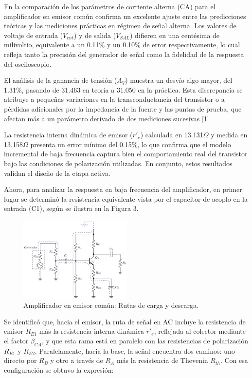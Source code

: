 \documentclass[journal]{IEEEtran}
\begin{document}
\par En la comparación de los parámetros de corriente alterna (CA) para el amplificador en emisor común confirma un excelente ajuste entre las predicciones teóricas y las mediciones prácticas en régimen de señal alterna. Los valores de voltaje de entrada (\( V_{ent}\)) y de salida (\( V_{SAL} \)) difieren en una centésima de milivoltio, equivalente a un 0.11\% y un 0.10\% de error respectivamente, lo cual refleja tanto la precisión del generador de señal como la fidelidad de la respuesta del osciloscopio. 
\par El análisis de la ganancia de tensión (\( A_V \)) muestra un desvío algo mayor, del 1.31\%, pasando de 31.463 en teoría a 31.050 en la práctica. Esta discrepancia se atribuye a pequeñas variaciones en la transconductancia del transistor o a pérdidas adicionales por la impedancia de la fuente y las puntas de prueba, que afectan más a un parámetro derivado de dos mediciones sucesivas [1].
\par La resistencia interna dinámica de emisor (\( r'_e \)) calculada en 13.131$\Omega$ y medida en 13.158$\Omega$ presenta un error mínimo del 0.15\%, lo que confirma que el modelo incremental de baja frecuencia captura bien el comportamiento real del transistor bajo las condiciones de polarización utilizadas. En conjunto, estos resultados validan el diseño de la etapa activa. 
\par Ahora, para analizar la respuesta en baja frecuencia del amplificador, en primer lugar se determinó la resistencia equivalente vista por el capacitor de acoplo en la entrada (C1), según se ilustra en la Figura 3.
\begin{figure}[H]
    \centering
    \includegraphics[width=0.5\textwidth]{Media/rutas_carga_descarga.png}
    \caption{Amplificador en emisor común: Rutas de carga y descarga.}
    \label{fig:rutas_carga_descarga}
\end{figure}
\par Se identificó que, hacia el emisor, la ruta de señal en AC incluye la resistencia de emisor \( R_{E1} \) más la resistencia interna dinámica \( r'_e \), reflejada al colector mediante el factor $\beta_{CA}$, y que esta rama está en paralelo con las resistencias de polarización \( R_{E1} \) y \( R_{E2} \). Paralelamente, hacia la base, la señal encuentra dos caminos: uno directo por \( R_B \) y otro a través de \( R_A \) más la resistencia de Thevenin \( R_{th} \). Con esa configuración se obtuvo la expresión:
\end{document}
